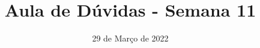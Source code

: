 \documentclass{beamer}
\title{Aula de Dúvidas - Semana 11}
\author[\autor]{\autor}
\institute[\instituto]{\instituto}
\date{29 de Março de 2022}
\begin{document}
    \begin{frame}
        \maketitle
    \end{frame}
\end{document}
